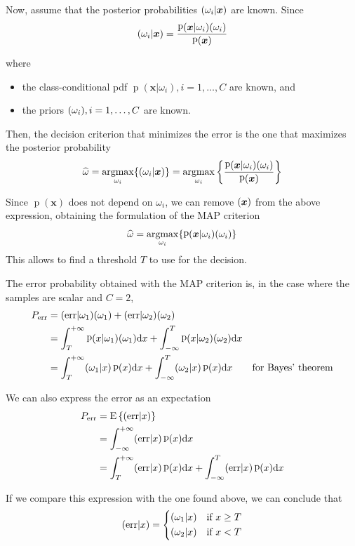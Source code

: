 \documentclass[oneside,onecolumn]{report}
\newcommand{\E}[1]{\text{E} \left\{ #1 \right\}}
\DeclareMathOperator*{\argmax}{argmax}
\DeclareMathOperator*{\pdf}{p}
\let\P\relax
\DeclareMathOperator*{\P}{P}
\begin{document}
Now, assume that the posterior probabilities $\P(\omega_i | \bm x)$ are known.
Since
$$ \P(\omega_i | \bm x) = \frac{\pdf(\bm x | \omega_i) \P(\omega_i)}{\pdf(\bm x)} $$

where
\begin{itemize}
    \item the class-conditional pdf $\pdf(\bm x | \omega_i), i = 1, \dots, C$ are known, and
    \item the priors $\P(\omega_i), i = 1, \dots, C$ are known.
\end{itemize}

Then, the decision criterion that minimizes the error is the one that maximizes the posterior probability
$$ \widehat \omega = \argmax_{\omega_i} \{ \P(\omega_i | \bm x) \} = \argmax_{\omega_i} \left\{ \frac{\pdf(\bm x | \omega_i) \P(\omega_i)}{\pdf(\bm x)} \right\} $$

Since $\pdf(\bm x)$ does not depend on $\omega_i$, we can remove $\P(\bm x)$ from the above expression, obtaining the formulation of the MAP criterion
$$ \widehat \omega = \argmax_{\omega_i} \{ \pdf(\bm x | \omega_i) \P(\omega_i) \} $$
This allows to find a threshold $T$ to use for the decision.

The error probability obtained with the MAP criterion is, in the case where the samples are scalar and $C = 2$,
\begin{align*}
    P_\text{err}
    &= \P(\text{err} | \omega_1) \P(\omega_1) + \P(\text{err} | \omega_2) \P(\omega_2) \\
    &= \int_T^{+\infty} \pdf(x | \omega_1) \P(\omega_1) \dd x + \int_{-\infty}^T \pdf(x | \omega_2) \P(\omega_2) \dd x \\
    &= \int_T^{+\infty} \P(\omega_1 | x) \pdf(x) \dd x + \int_{-\infty}^T \P(\omega_2 | x) \pdf(x) \dd x & \text{for Bayes' theorem}
\end{align*}

We can also express the error as an expectation
\begin{align*}
    P_\text{err}
    &= \E{\P(\text{err} | x)} \\
    &= \int_{-\infty}^{+\infty} \P(\text{err} | x) \pdf(x) \dd x \\
    &= \int_T^{+\infty} \P(\text{err} | x) \pdf(x) \dd x + \int_{-\infty}^T \P(\text{err} | x) \pdf(x) \dd x
\end{align*}

If we compare this expression with the one found above, we can conclude that
$$ \P(\text{err} | x) = \begin{dcases}
    \P(\omega_1 | x) & \text{if } x \geq T \\
    \P(\omega_2 | x) & \text{if } x < T
\end{dcases} $$
\end{document}

